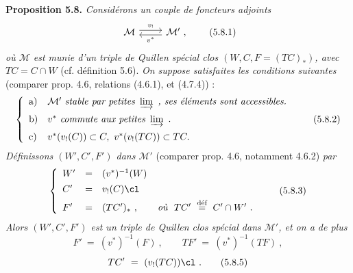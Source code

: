 \textbf{Proposition 5.8.} \textit{Considérons un couple de foncteurs adjoints}
\[
\begin{tikzcd}
\mathcal{M} \arrow[r, shift left, "v_!"] & \mathcal{M}' \arrow[l, shift left, "v^*"] \ ,
\end{tikzcd}
\tag*{(5.8.1)}
\]
\textit{où $\mathcal{M}$ est munie d'un triple de Quillen spécial clos $(W, C, F = (TC)_*)$, avec $TC = C \cap W$} (cf. définition 5.6). \textit{On suppose satisfaites les conditions suivantes} (comparer prop. 4.6, relations (4.6.1), et (4.7.4)) :
\[
\left\{
\begin{array}{ll}
\text{a)} & \mathcal{M}' \ \textit{stable par petites}\ \varinjlim\ \textit{, ses éléments sont accessibles.}\\[1.5ex]
\text{b)} & v^* \ \textit{commute aux petites}\ \varinjlim\ .\\[1.5ex]
\text{c)} & v^*(v_!(C)) \subset C,\ v^*(v_!(TC)) \subset TC.
\end{array}
\right.
\tag*{(5.8.2)}
\]
\textit{Définissons $(W', C', F')$ dans $\mathcal{M}'$} (comparer prop. 4.6, notamment 4.6.2) \textit{par}
\[
\left\{
\begin{array}{lcl}
W' & = & (v^*)^{-1}(W)\\[1ex]
C' & = & v_!(C)\cl\\[1ex]
F' & = & (TC')_*\ , \qquad \textit{où}\ \ TC' \ \defeq \ C' \cap W'\ .
\end{array}
\right.
\tag*{(5.8.3)}
\]
\textit{Alors $(W', C', F')$ est un triple de Quillen clos spécial dans $\mathcal{M}'$, et on a de plus}
\[
F' \ = \ (v^*)^{-1}(F)\ , \qquad TF' \ = \ (v^*)^{-1}(TF)\ ,
\tag*{(5.8.4)}
\]
\[
TC' \ = \ (v_!(TC))\cl\ .
\tag*{(5.8.5)}
\]

